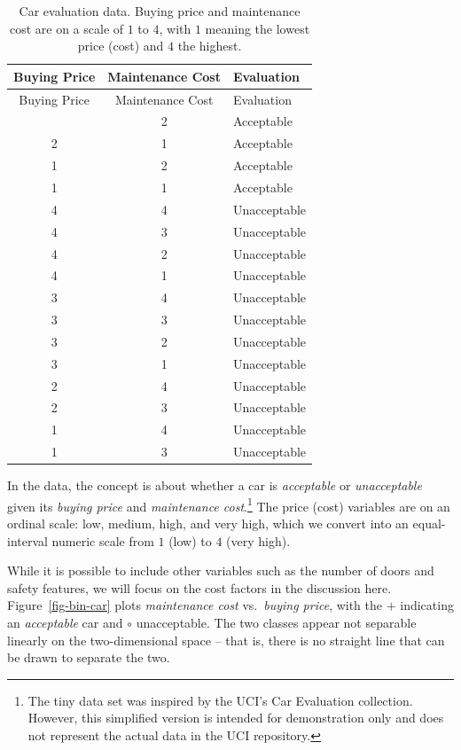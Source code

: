 \documentclass[
  letterpaper,
]{scrbook}
\begin{document}
\protect{}\label{tab-bin-car}
\begin{longtable}[]{@{}ccl@{}}
\caption{Car evaluation data. Buying price and maintenance cost are on a
scale of \(1\) to \(4\), with \(1\) meaning the lowest price (cost) and
\(4\) the highest.}\tabularnewline
\toprule\noalign{}
Buying Price & Maintenance Cost & Evaluation \\
\midrule\noalign{}
\endfirsthead
\toprule\noalign{}
Buying Price & Maintenance Cost & Evaluation \\
\midrule\noalign{}
\endhead
\bottomrule\noalign{}
\endlastfoot
2 & 2 & Acceptable \\
2 & 1 & Acceptable \\
1 & 2 & Acceptable \\
1 & 1 & Acceptable \\
4 & 4 & Unacceptable \\
4 & 3 & Unacceptable \\
4 & 2 & Unacceptable \\
4 & 1 & Unacceptable \\
3 & 4 & Unacceptable \\
3 & 3 & Unacceptable \\
3 & 2 & Unacceptable \\
3 & 1 & Unacceptable \\
2 & 4 & Unacceptable \\
2 & 3 & Unacceptable \\
1 & 4 & Unacceptable \\
1 & 3 & Unacceptable \\
\end{longtable}

In the data, the concept is about whether a car is \emph{acceptable} or
\emph{unacceptable} given its \emph{buying price} and \emph{maintenance
cost}.\footnote{The tiny data set was inspired by the UCI's Car
  Evaluation collection. However, this simplified version is intended
  for demonstration only and does not represent the actual data in the
  UCI repository.} The price (cost) variables are on an ordinal scale:
low, medium, high, and very high, which we convert into an
equal-interval numeric scale from \(1\) (low) to \(4\) (very high).

While it is possible to include other variables such as the number of
doors and safety features, we will focus on the cost factors in the
discussion here. Figure~\ref{fig-bin-car} plots \emph{maintenance cost}
vs.~\emph{buying price}, with the \(+\) indicating an \emph{acceptable}
car and \(\circ\) unacceptable. The two classes appear not separable
linearly on the two-dimensional space -- that is, there is no straight
line that can be drawn to separate the two.
\end{document}
